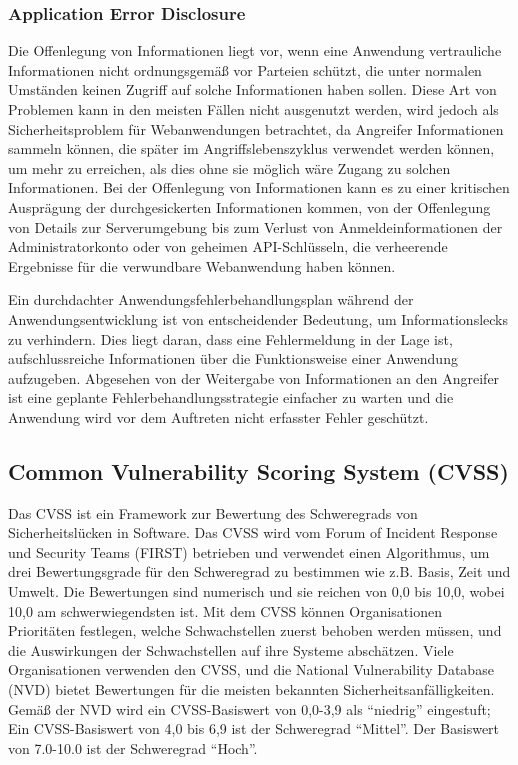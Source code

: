 \subsubsection{Application Error Disclosure}

Die Offenlegung von Informationen liegt vor, wenn eine Anwendung vertrauliche Informationen nicht ordnungsgemäß vor Parteien schützt, die unter normalen Umständen keinen Zugriff auf solche Informationen haben sollen. Diese Art von Problemen kann in den meisten Fällen nicht ausgenutzt werden, wird jedoch als Sicherheitsproblem für Webanwendungen betrachtet, da Angreifer Informationen sammeln können, die später im Angriffslebenszyklus verwendet werden können, um mehr zu erreichen, als dies ohne sie möglich wäre Zugang zu solchen Informationen. Bei der Offenlegung von Informationen kann es zu einer kritischen Ausprägung der durchgesickerten Informationen kommen, von der Offenlegung von Details zur Serverumgebung bis zum Verlust von Anmeldeinformationen der Administratorkonto oder von geheimen API-Schlüsseln, die verheerende Ergebnisse für die verwundbare Webanwendung haben können\cite{infdiscissattack17}.

Ein durchdachter Anwendungsfehlerbehandlungsplan während der Anwendungsentwicklung ist von entscheidender Bedeutung, um Informationslecks zu verhindern. Dies liegt daran, dass eine Fehlermeldung in der Lage ist, aufschlussreiche Informationen über die Funktionsweise einer Anwendung aufzugeben. Abgesehen von der Weitergabe von Informationen an den Angreifer ist eine geplante Fehlerbehandlungsstrategie einfacher zu warten und die Anwendung wird vor dem Auftreten nicht erfasster Fehler geschützt\cite{ase17}.

\subsection{Common Vulnerability Scoring System (CVSS)}

Das CVSS ist ein Framework zur Bewertung des Schweregrads von Sicherheitslücken in Software. Das CVSS wird vom Forum of Incident Response und Security Teams (FIRST) betrieben und verwendet einen Algorithmus, um drei Bewertungsgrade für den Schweregrad zu bestimmen wie z.B. Basis, Zeit und Umwelt. Die Bewertungen sind numerisch und sie reichen von 0,0 bis 10,0, wobei 10,0 am schwerwiegendsten ist. Mit dem CVSS können Organisationen Prioritäten festlegen, welche Schwachstellen zuerst behoben werden müssen, und die Auswirkungen der Schwachstellen auf ihre Systeme abschätzen. Viele Organisationen verwenden den CVSS, und die National Vulnerability Database (NVD) bietet Bewertungen für die meisten bekannten Sicherheitsanfälligkeiten. Gemäß der NVD wird ein CVSS-Basiswert von 0,0-3,9 als "`niedrig"' eingestuft; Ein CVSS-Basiswert von 4,0 bis 6,9 ist der Schweregrad "`Mittel"'. Der Basiswert von 7.0-10.0 ist der Schweregrad "`Hoch"'\cite{cvss16}.\\

